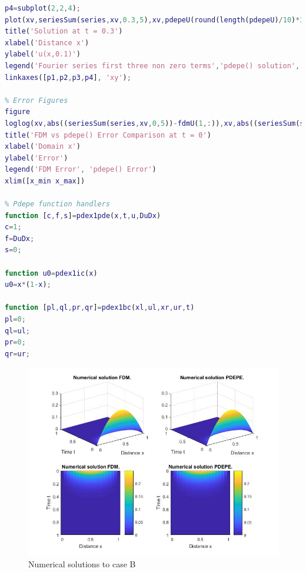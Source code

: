 \documentclass{article}
\begin{document}
\begin{lstlisting}[language=Matlab]
p4=subplot(2,2,4);
plot(xv,seriesSum(series,xv,0.3,5),xv,pdepeU(round(length(pdepeU)/10)*3,:),'-.',xv,fdmU(round(length(fdmU)/10)*3,:),'*')
title('Solution at t = 0.3')
xlabel('Distance x')
ylabel('u(x,0.1)')
legend('Fourier series first three non zero terms','pdepe() solution','Finite Difference method')
linkaxes([p1,p2,p3,p4], 'xy');

% Error Figures
figure
loglog(xv,abs((seriesSum(series,xv,0,5))-fdmU(1,:)),xv,abs((seriesSum(series,xv,0,5))-pdepeU(2,:)));
title('FDM vs pdepe() Error Comparison at t = 0')
xlabel('Domain x')
ylabel('Error')
legend('FDM Error', 'pdepe() Error')
xlim([x_min x_max])

% Pdepe function handlers
function [c,f,s]=pdex1pde(x,t,u,DuDx)
c=1;
f=DuDx;
s=0;

function u0=pdex1ic(x)
u0=x*(1-x);

function [pl,ql,pr,qr]=pdex1bc(xl,ul,xr,ur,t)
pl=0;
ql=ul;
pr=0;
qr=ur;
\end{lstlisting}
\begin{figure}
	\begin{center}
		\includegraphics[width=\textwidth,height=\textheight,keepaspectratio]{MATLAB/B1.jpg}
	\end{center}
	\caption{Numerical solutions to case B}
\end{figure}
\end{document}
